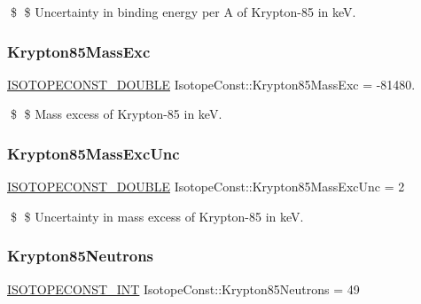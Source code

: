 \$ \$ Uncertainty in binding energy per A of Krypton-\/85 in keV. \mbox{\label{group___isotope_const-_krypton-_kr85_gae6af21f1dba80f25f29b5e9a6067912d}} 
\subsubsection{\texorpdfstring{Krypton85\+Mass\+Exc}{Krypton85MassExc}}
{\footnotesize\ttfamily \mbox{\hyperlink{group___isotope_const-_macros_ga8f45a7272ce02c0b4c65c44636ed719a}{I\+S\+O\+T\+O\+P\+E\+C\+O\+N\+S\+T\+\_\+\+D\+O\+U\+B\+LE}} Isotope\+Const\+::\+Krypton85\+Mass\+Exc = -\/81480.}

\$ \$ Mass excess of Krypton-\/85 in keV. \mbox{\label{group___isotope_const-_krypton-_kr85_ga1ca32196cc8be4d9471af58053d85654}} 
\subsubsection{\texorpdfstring{Krypton85\+Mass\+Exc\+Unc}{Krypton85MassExcUnc}}
{\footnotesize\ttfamily \mbox{\hyperlink{group___isotope_const-_macros_ga8f45a7272ce02c0b4c65c44636ed719a}{I\+S\+O\+T\+O\+P\+E\+C\+O\+N\+S\+T\+\_\+\+D\+O\+U\+B\+LE}} Isotope\+Const\+::\+Krypton85\+Mass\+Exc\+Unc = 2}

\$ \$ Uncertainty in mass excess of Krypton-\/85 in keV. \mbox{\label{group___isotope_const-_krypton-_kr85_ga031921d39d518da90486120f21ae9b83}} 
\subsubsection{\texorpdfstring{Krypton85\+Neutrons}{Krypton85Neutrons}}
{\footnotesize\ttfamily \mbox{\hyperlink{group___isotope_const-_macros_ga5f18360b3e99483a35c32d789e62621c}{I\+S\+O\+T\+O\+P\+E\+C\+O\+N\+S\+T\+\_\+\+I\+NT}} Isotope\+Const\+::\+Krypton85\+Neutrons = 49}

